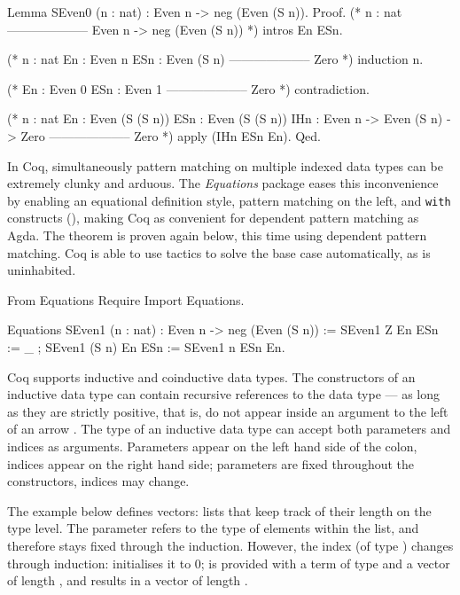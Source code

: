 \documentclass{mproj}
\begin{document}
\begin{coq}
Lemma SEven0 (n : nat) : Even n -> neg (Even (S n)).
Proof.
  (* n : nat
     --------------------
     Even n -> neg (Even (S n)) *)
  intros En ESn.

  (* n : nat 
     En : Even n
     ESn : Even (S n)
     --------------------
     Zero *)
  induction n.

  (* En : Even 0
     ESn : Even 1
     --------------------
     Zero *)
  contradiction.

  (* n : nat
     En : Even (S (S n))
     ESn : Even (S (S n))
     IHn : Even n -> Even (S n) -> Zero
     --------------------
     Zero *)
  apply (IHn ESn En).
Qed.
\end{coq}

In Coq, simultaneously pattern matching on multiple indexed data types can be extremely clunky and arduous. The \emph{Equations} package eases this inconvenience by enabling an equational definition style, pattern matching on the left, and \texttt{with} constructs (\cite{McBride2004}), making Coq as convenient for dependent pattern matching as Agda. The theorem  is proven again below, this time using dependent pattern matching. Coq is able to use tactics to solve the base case automatically, as  is uninhabited.

\begin{coq}
From Equations Require Import Equations.

Equations SEven1 (n : nat) : Even n -> neg (Even (S n)) := {
SEven1 Z     En ESn := _ ;
SEven1 (S n) En ESn := SEven1 n ESn En}.
\end{coq}

Coq supports inductive and coinductive data types. The constructors of an inductive data type can contain recursive references to the data type --- as long as they are strictly positive, that is, do not appear inside an argument to the left of an arrow \cite{Dybjer1994}. The type of an inductive data type can accept both parameters and indices as arguments. Parameters appear on the left hand side of the colon, indices appear on the right hand side; parameters are fixed throughout the constructors, indices may change.

The example below defines vectors: lists that keep track of their length on the type level. The parameter  refers to the type of elements within the list, and therefore stays fixed through the induction. However, the index (of type ) changes through induction:  initialises it to 0;  is provided with a term of type  and a vector of length , and results in a vector of length .
\end{document}
